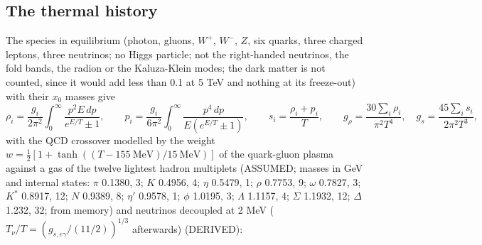 \documentclass[
  10pt,
]{article}
\begin{document}
\hypertarget{the-thermal-history}{%
\subsection{The thermal history}\label{the-thermal-history}}

The species in equilibrium (photon, gluons, \(W^+\), \(W^-\), \(Z\), six
quarks, three charged leptons, three neutrinos; no Higgs particle; not
the right-handed neutrinos, the fold bands, the radion or the
Kaluza-Klein modes; the dark matter is not counted, since it would add
less than 0.1 at 5 TeV and nothing at its freeze-out) with their \(x_0\)
masses give
\[ \rho_i = \frac{g_i}{2\pi^2}\int_0^\infty\frac{p^2E\,dp}{e^{E/T}\pm1},\qquad p_i = \frac{g_i}{6\pi^2}\int_0^\infty\frac{p^4\,dp}{E(e^{E/T}\pm1)},\qquad s_i = \frac{\rho_i + p_i}{T},\qquad
   g_\rho = \frac{30\sum_i\rho_i}{\pi^2T^4},\quad g_s = \frac{45\sum_is_i}{2\pi^2T^3}, \]
with the QCD crossover modelled by the weight
\(w = \frac12[1 + \tanh((T - 155\ \text{MeV})/15\ \text{MeV})]\) of the
quark-gluon plasma against a gas of the twelve lightest hadron
multiplets (ASSUMED; masses in GeV and internal states: \(\pi\) 0.1380,
3; \(K\) 0.4956, 4; \(\eta\) 0.5479, 1; \(\rho\) 0.7753, 9; \(\omega\)
0.7827, 3; \(K^*\) 0.8917, 12; \(N\) 0.9389, 8; \(\eta'\) 0.9578, 1;
\(\phi\) 1.0195, 3; \(\Lambda\) 1.1157, 4; \(\Sigma\) 1.1932, 12;
\(\Delta\) 1.232, 32; from memory) and neutrinos decoupled at 2 MeV
(\(T_\nu/T = (g_{s,e\gamma}/(11/2))^{1/3}\) afterwards) (DERIVED):
\end{document}
